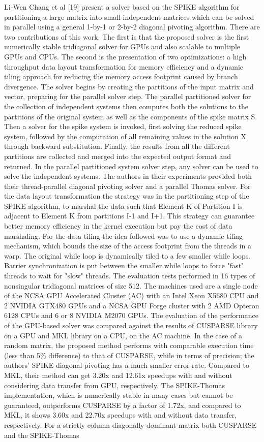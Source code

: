 Li-Wen Chang et al [19] present a solver based on the SPIKE algorithm for partitioning a large matrix into small independent matrices which can be solved in parallel using a general 1-by-1 or 2-by-2 diagonal pivoting algorithm. There are two contributions of this work. The first is that the proposed solver is the first numerically stable tridiagonal solver for GPUs and also scalable to multiple GPUs and CPUs. The second is the presentation of two optimizations: a high throughput data layout transformation for memory efficiency and a dynamic tiling approach for reducing the memory access footprint caused by branch divergence. The solver begins by creating the partitions of the input matrix and vector, preparing for the parallel solver step. The parallel partitioned solver for the collection of independent systems then computes both the solutions to the partitions of the original system as well as the components of the spike matrix S.  Then a solver for the spike system is invoked, first solving the reduced spike system, followed by the computation of all remaining values in the solution X through backward substitution. Finally, the results from all the different partitions are collected and merged into the expected output format and returned. In the parallel partitioned system solver step, any solver can be used to solve the independent systems. The authors in their experiments provided both their thread-parallel diagonal pivoting solver and a parallel Thomas solver. For the data layout transformation the strategy was in the partitioning step of the SPIKE algorithm, to marshal the data such that Element K of Partition I is adjacent to Element K from partitions I-1 and I+1. This strategy can guarantee better memory efficiency in the kernel execution but pay the cost of data marshaling. For the data tiling the idea followed was to use a dynamic tiling mechanism, which bounds the size of the access footprint from the threads in a warp. The original while loop is dynamically tiled to a few smaller while loops. Barrier synchronization is put between the smaller while loops to force "fast" threads to wait for "slow" threads. The evaluation tests performed in 16 types of nonsingular tridiagonal matrices of size 512. The machines used are a single node of the NCSA GPU Accelerated Cluster (AC) with an Intel Xeon X5680 CPU and 2 NVIDIA GTX480 GPUs and a NCSA GPU Forge cluster with 2 AMD Opteron 6128 CPUs and 6 or 8 NVIDIA M2070 GPUs. The evaluation of the performance of the GPU-based solver was compared against the results of CUSPARSE library on a GPU and MKL library on a CPU, on the AC machine. In the case of a random matrix, the proposed method performs with comparable execution time (less than 5\% difference) to that of CUSPARSE, while in terms of precision; the authors’ SPIKE diagonal pivoting has a much smaller error rate. Compared to MKL, their method can get 3.20x and 12.61x speedups with and without considering data transfer from GPU, respectively. The SPIKE-Thomas implementation, which is numerically stable in many cases but cannot be guaranteed, outperforms CUSPARSE by a factor of 1.72x, and compared to MKL, it shows 3.60x and 22.70x speedups with and without data transfer, respectively. For a strictly column diagonally dominant matrix both CUSPARSE and the SPIKE-Thomas 
